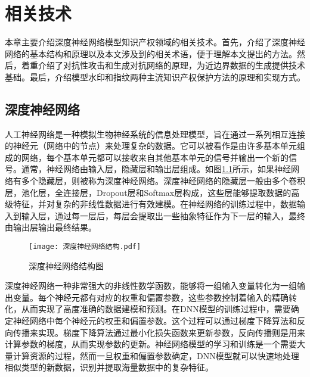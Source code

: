 

\chapter{相关技术} \label{2}

本章主要介绍深度神经网络模型知识产权领域的相关技术。首先，介绍了深度神经网络的基本结构和原理以及本文涉及到的相关术语，便于理解本文提出的方法。然后，着重介绍了对抗性攻击和生成对抗网络的原理，为近边界数据的生成提供技术基础。最后，介绍模型水印和指纹两种主流知识产权保护方法的原理和实现方式。

\section{深度神经网络}

人工神经网络是一种模拟生物神经系统的信息处理模型，旨在通过一系列相互连接的神经元（网络中的节点）来处理复杂的数据。它可以被看作是由许多基本单元组成的网络，每个基本单元都可以接收来自其他基本单元的信号并输出一个新的信号。通常，神经网络由输入层，隐藏层和输出层组成。如图\ref{深度神经网络结构图}所示，如果神经网络有多个隐藏层，则被称为深度神经网络。深度神经网络的隐藏层一般由多个卷积层，池化层，全连接层，Dropout层和Softmax层构成，这些层能够提取数据的高级特征，并对复杂的非线性数据进行有效建模。在神经网络的训练过程中，数据输入到输入层，通过每一层后，每层会提取出一些抽象特征作为下一层的输入，最终由输出层输出最终结果。
	
\begin{figure}[htbp]%
	\centering
	\setlength{\abovecaptionskip}{3mm} %
	\setlength{\belowcaptionskip}{-3mm} %
	\texttt{[image: 深度神经网络结构.pdf]}
	\caption{深度神经网络结构图}
	\label{深度神经网络结构图}
	\end {figure}

深度神经网络一种非常强大的非线性数学函数，能够将一组输入变量转化为一组输出变量。每个神经元都有对应的权重和偏置参数，这些参数控制着输入的精确转化，从而实现了高度准确的数据建模和预测。在DNN模型的训练过程中，需要确定神经网络中每个神经元的权重和偏置参数。这个过程可以通过梯度下降算法和反向传播来实现。梯度下降算法通过最小化损失函数来更新参数，反向传播则是用来计算参数的梯度，从而实现参数的更新。神经网络模型的学习和训练是一个需要大量计算资源的过程，然而一旦权重和偏置参数确定，DNN模型就可以快速地处理相似类型的新数据，识别并提取海量数据中的复杂特征。

